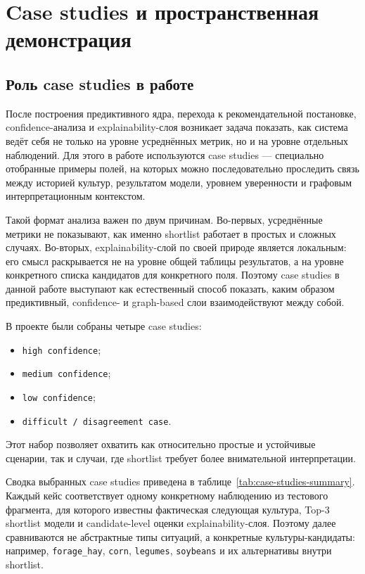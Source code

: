 \section{Case studies и пространственная демонстрация}

\subsection{Роль case studies в работе}

После построения предиктивного ядра, перехода к рекомендательной постановке, confidence-анализа и explainability-слоя
возникает задача показать, как система ведёт себя не только на уровне усреднённых метрик, но и на уровне отдельных
наблюдений. Для этого в работе используются case studies --- специально отобранные примеры полей, на которых можно
последовательно проследить связь между историей культур, результатом модели, уровнем уверенности и графовым
интерпретационным контекстом.

Такой формат анализа важен по двум причинам. Во-первых, усреднённые метрики не показывают, как именно shortlist работает
в простых и сложных случаях. Во-вторых, explainability-слой по своей природе является локальным: его смысл раскрывается
не на уровне общей таблицы результатов, а на уровне конкретного списка кандидатов для конкретного поля. Поэтому case
studies в данной работе выступают как естественный способ показать, каким образом предиктивный, confidence- и
graph-based слои взаимодействуют между собой.

В проекте были собраны четыре case studies:

\begin{itemize}
\tightlist
\item
  \texttt{high\ confidence};
\item
  \texttt{medium\ confidence};
\item
  \texttt{low\ confidence};
\item
  \texttt{difficult\ /\ disagreement\ case}.
\end{itemize}

Этот набор позволяет охватить как относительно простые и устойчивые сценарии, так и случаи, где shortlist требует более
внимательной интерпретации.

Сводка выбранных case studies приведена в таблице~\ref{tab:case-studies-summary}. Каждый кейс соответствует одному
конкретному наблюдению из тестового фрагмента, для которого известны фактическая следующая культура, Top-3 shortlist
модели и candidate-level оценки explainability-слоя. Поэтому далее сравниваются не абстрактные типы ситуаций, а
конкретные культуры-кандидаты: например, \texttt{forage\_hay}, \texttt{corn}, \texttt{legumes}, \texttt{soybeans} и
их альтернативы внутри shortlist.

